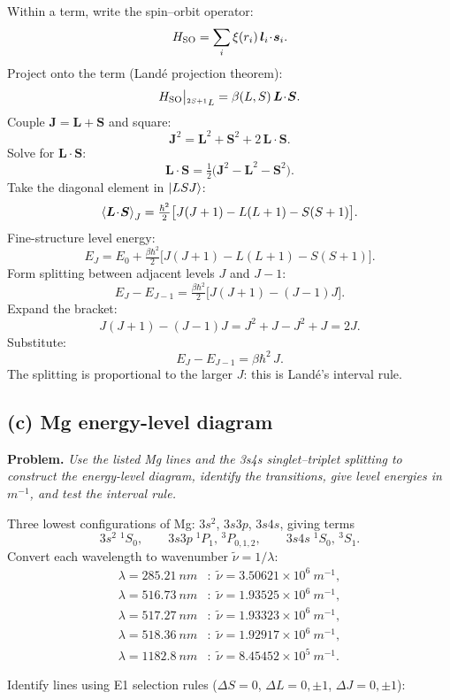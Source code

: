 \documentclass[11pt]{article}
\begin{document}
Within a term, write the spin--orbit operator:
\[
H_{\rm SO}=\sum_i\xi(r_i)\,\bm l_i\!\cdot\!\bm s_i.
\]
Project onto the term (Land\'e projection theorem):
\[
H_{\rm SO}\big|_{^{2S+1}L}=\beta(L,S)\,\bm L\!\cdot\!\bm S.
\]
Couple $\bm J=\bm L+\bm S$ and square:
\[
\bm J^{2}=\bm L^{2}+\bm S^{2}+2\,\bm L\!\cdot\!\bm S.
\]
Solve for $\bm L\cdot\bm S$:
\[
\bm L\!\cdot\!\bm S=\tfrac12\bigl(\bm J^{2}-\bm L^{2}-\bm S^{2}\bigr).
\]
Take the diagonal element in $\ket{LSJ}$:
\[
\Braket{\bm L\!\cdot\!\bm S}_J=\tfrac{\hbar^{2}}{2}\bigl[J(J+1)-L(L+1)-S(S+1)\bigr].
\]
Fine-structure level energy:
\[
E_J=E_0+\tfrac{\beta\hbar^{2}}{2}\bigl[J(J+1)-L(L+1)-S(S+1)\bigr].
\]
Form splitting between adjacent levels $J$ and $J-1$:
\[
E_J-E_{J-1}=\tfrac{\beta\hbar^{2}}{2}\bigl[J(J+1)-(J-1)J\bigr].
\]
Expand the bracket:
\[
J(J+1)-(J-1)J=J^{2}+J-J^{2}+J=2J.
\]
Substitute:
\begin{equation}
\boxed{\;E_J-E_{J-1}=\beta\hbar^{2}\,J.\;}
\label{eq:interval}
\end{equation}
The splitting is proportional to the larger $J$: this is Land\'e's interval rule.

\subsection*{(c) Mg energy-level diagram}

\textbf{Problem.} \emph{Use the listed Mg lines and the 3s4s singlet--triplet splitting to construct the energy-level diagram, identify the transitions, give level energies in $\unit{m^{-1}}$, and test the interval rule.}

Three lowest configurations of Mg: $3s^{2}$, $3s3p$, $3s4s$, giving terms
\[
3s^{2}\;{}^{1}\!S_0,\qquad 3s3p\;{}^{1}\!P_1,\,{}^{3}\!P_{0,1,2},\qquad 3s4s\;{}^{1}\!S_0,\,{}^{3}\!S_1.
\]
Convert each wavelength to wavenumber $\tilde\nu=1/\lambda$:
\begin{align*}
\lambda=\SI{285.21}{nm}&:\;\tilde\nu=3.50621\times 10^{6}\ \unit{m^{-1}},\\
\lambda=\SI{516.73}{nm}&:\;\tilde\nu=1.93525\times 10^{6}\ \unit{m^{-1}},\\
\lambda=\SI{517.27}{nm}&:\;\tilde\nu=1.93323\times 10^{6}\ \unit{m^{-1}},\\
\lambda=\SI{518.36}{nm}&:\;\tilde\nu=1.92917\times 10^{6}\ \unit{m^{-1}},\\
\lambda=\SI{1182.8}{nm}&:\;\tilde\nu=8.45452\times 10^{5}\ \unit{m^{-1}}.
\end{align*}

Identify lines using E1 selection rules ($\Delta S=0$, $\Delta L=0,\pm1$, $\Delta J=0,\pm1$):
\end{document}
